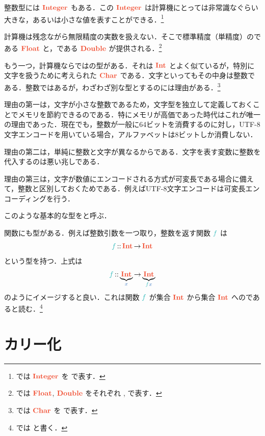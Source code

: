 \documentclass[a5paper,twoside,fleqn,draft]{jsbook}
\begin{document}
整数型には $\mIntegerType$ もある．この $\mIntegerType$ は計算機にとっては非常識なぐらい大きな，あるいは小さな値を表すことができる．\footnote{\haskell では $\mIntegerType$ を  で表す．}

計算機は残念ながら無限精度の実数を扱えない．そこで標準精度（単精度）のである $\mFloatType$ と，である $\mDoubleType$ が提供される．\footnote{\haskell では $\mFloatType$, $\mDoubleType$ をそれぞれ ,  で表す．}

もう一つ，計算機ならではの型がある．それは $\mIntType$ とよく似ているが，特別に文字を扱うために考えられた $\mCharType$ である．文字といってもその中身は整数である．整数ではあるが，わざわざ別な型とするのには理由がある．\footnote{\haskell では $\mCharType$ を  で表す．}

理由の第一は，文字が小さな整数であるため，文字型を独立して定義しておくことでメモリを節約できるのである．特にメモリが高価であった時代はこれが唯一の理由であった．現在でも，整数が一般に64ビットを消費するのに対し，UTF-8文字エンコードを用いている場合，アルファベットは8ビットしか消費しない．

理由の第二は，単純に整数と文字が異なるからである．文字を表す変数に整数を代入するのは悪い兆しである．

理由の第三は，文字が数値にエンコードされる方式が可変長である場合に備えて，整数と区別しておくためである．例えばUTF-8文字エンコードは可変長エンコーディングを行う．

このような基本的な型をと呼ぶ．

\separator

関数にも型がある．例えば整数引数を一つ取り，整数を返す関数 $\hFunc{f}$ は
\begin{equation}
  \hFunc{f}
  \mIn\mIntType
  \mFuncArrow\mIntType
\end{equation}
という型を持つ．上式は
\begin{equation}
  \hFunc{f}
  \mIn\underbrace{\mIntType}_{\hVar{x}}
  \mFuncArrow\underbrace{\mIntType}_{\hFunc{f}\hVar{x}}
\end{equation}
のようにイメージすると良い．これは関数 $\hFunc{f}$ が集合 $\mIntType$ から集合 $\mIntType$ へのであると読む．\footnote{\haskell では  と書く．}

\section{カリー化}
\end{document}

